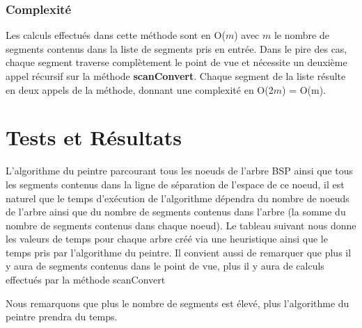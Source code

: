 \documentclass[11pt,a4paper]{article}
\theoremstyle{definition}
\theoremstyle{remark}
\begin{document}
\subsubsection{Complexité}
Les calculs effectués dans cette méthode sont en O($m$) avec $m$ le nombre de segments contenus dans la liste de segments pris en entrée. Dans le pire des cas, chaque segment traverse complètement le point de vue et nécessite un deuxième appel récursif sur la méthode \textbf{scanConvert}. Chaque segment de la liste résulte en deux appels de la méthode, donnant une complexité en O(2$m$) = O(m).

\section{Tests et Résultats}
L'algorithme du peintre parcourant tous les noeuds de l'arbre BSP ainsi que tous les segments contenus dans la ligne de séparation de l'espace de ce noeud, il est naturel que le temps d'exécution de l'algorithme dépendra du nombre de noeuds de l'arbre ainsi que du nombre de segments contenus dans l'arbre (la somme du nombre de segments contenus dans chaque noeud). Le tableau suivant nous donne les valeurs de temps pour chaque arbre créé via une heuristique ainsi que le temps pris par l'algorithme du peintre. Il convient aussi de remarquer que plus il y aura de segments contenus dans le point de vue, plus il y aura de calculs effectués par la méthode scanConvert

Nous remarquons que plus le nombre de segments est élevé, plus l'algorithme du peintre prendra du temps.
\end{document}
